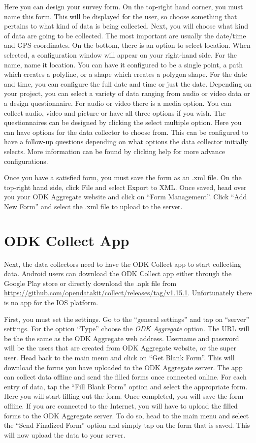 Here you can design your survey form. On the top-right hand corner, you must name this form. This will be displayed for the user, so choose something that pertains to what kind of data is being collected. Next, you will choose what kind of data are going to be collected. The most important are usually the date/time and GPS coordinates. On the bottom, there is an option to select location. When selected, a configuration window will appear on your right-hand side. For the name, name it location. You can have it configured to be a single point, a path which creates a polyline, or a shape which creates a polygon shape. For the date and time, you can configure the full date and time or just the date. Depending on your project, you can select a variety of data ranging from audio or video data or a design questionnaire. For audio or video there is a media option. You can collect audio, video and picture or have all three options if you wish. The questionnaires can be designed by clicking the select multiple option. Here you can have options for the data collector to choose from. This can be configured to have a follow-up questions depending on what options the data collector initially selects. More information can be found by clicking help for more advance configurations.

Once you have a satisfied form, you must save the form as an .xml file. On the top-right hand side, click File and select Export to XML. Once saved, head over you your ODK Aggregate website and click on ``Form Management''. Click ``Add New Form'' and select the .xml file to upload to the server.

\section*{ODK Collect App}

Next, the data collectors need to have the ODK Collect app to start collecting data. Android users can download the ODK Collect app either through the Google Play store or directly download the .apk file from \url{https://github.com/opendatakit/collect/releases/tag/v1.15.1}. Unfortunately there is no app for the IOS platform.

First, you must set the settings. Go to the ``general settings'' and tap on ``server'' settings. For the option ``Type'' choose the \emph{ODK Aggregate} option. The URL will be the the same as the ODK Aggregate web address. Username and password will be the users that are created from ODK Aggregate website, or the super user. Head back to the main menu and click on ``Get Blank Form''. This will download the forms you have uploaded to the ODK Aggregate server. The app can collect data offline and send the filled forms once connected online. For each entry of data, tap the ``Fill Blank Form'' option and select the appropriate form. Here you will start filling out the form. Once completed, you will save the form offline. If you are connected to the Internet, you will have to upload the filled forms to the ODK Aggregate server. To do so, head to the main menu and select the ``Send Finalized Form'' option and simply tap on the form that is saved. This will now upload the data to your server.

